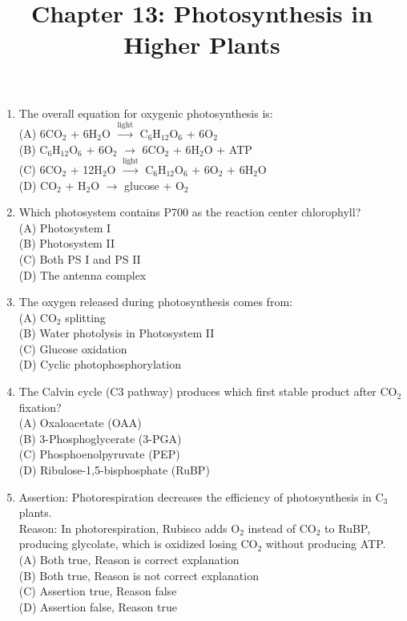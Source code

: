 \documentclass{article}
\begin{document}
\title{Chapter 13: Photosynthesis in Higher Plants}
\date{}
\maketitle

\begin{enumerate}[label=Q\arabic*.]

\item The overall equation for oxygenic photosynthesis is:
\\(A) 6CO$_2$ + 6H$_2$O $\xrightarrow{\text{light}}$ C$_6$H$_{12}$O$_6$ + 6O$_2$
\\(B) C$_6$H$_{12}$O$_6$ + 6O$_2$ $\rightarrow$ 6CO$_2$ + 6H$_2$O + ATP
\\(C) 6CO$_2$ + 12H$_2$O $\xrightarrow{\text{light}}$ C$_6$H$_{12}$O$_6$ + 6O$_2$ + 6H$_2$O
\\(D) CO$_2$ + H$_2$O $\rightarrow$ glucose + O$_2$

\item Which photosystem contains P700 as the reaction center chlorophyll?
\\(A) Photosystem I
\\(B) Photosystem II
\\(C) Both PS I and PS II
\\(D) The antenna complex

\item The oxygen released during photosynthesis comes from:
\\(A) CO$_2$ splitting
\\(B) Water photolysis in Photosystem II
\\(C) Glucose oxidation
\\(D) Cyclic photophosphorylation

\item The Calvin cycle (C3 pathway) produces which first stable product after CO$_2$ fixation?
\\(A) Oxaloacetate (OAA)
\\(B) 3-Phosphoglycerate (3-PGA)
\\(C) Phosphoenolpyruvate (PEP)
\\(D) Ribulose-1,5-bisphosphate (RuBP)

\item Assertion: Photorespiration decreases the efficiency of photosynthesis in C$_3$ plants.\\
Reason: In photorespiration, Rubisco adds O$_2$ instead of CO$_2$ to RuBP, producing glycolate, which is oxidized losing CO$_2$ without producing ATP.
\\(A) Both true, Reason is correct explanation
\\(B) Both true, Reason is not correct explanation
\\(C) Assertion true, Reason false
\\(D) Assertion false, Reason true


\end{enumerate}
\end{document}

